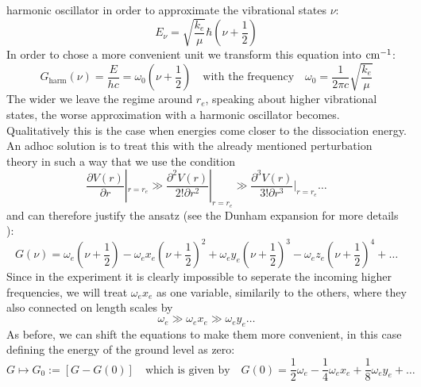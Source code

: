 harmonic oscillator in order to approximate
the vibrational states $\nu$:
\begin{equation}
    E_\nu =\sqrt{\frac{k_e}{\mu}}\hbar \left (\nu
        + \frac{1}{2}\right )
\end{equation}
In order to chose a more convenient unit we transform this
equation into $\mathrm{cm^{-1}}$:
\begin{equation}
    G_\mathrm{harm}\left(\nu\right) = \frac{E}{hc} = \omega_0 \left(\nu + \frac{1}{2}\right)
    \quad \text{with the frequency} \quad
    \omega_0 = \frac{1}{2\pi c} \sqrt{\frac{k_e}{\mu}}
    \label{eqn:freq}
\end{equation}
The wider we leave the regime around $r_e$, speaking about 
higher vibrational states, the worse approximation with a harmonic
oscillator becomes. Qualitatively this is the case when energies
come closer to the dissociation energy. An adhoc solution is 
to treat this with the already mentioned perturbation theory in such
a way that we use the condition
\begin{equation}
    \frac{\partial V(r)}{\partial r}|_{r=r_e}        \gg
    \frac{\partial^2 V(r)}{2!\partial r^2}|_{r=r_e}  \gg
    \frac{\partial^3 V(r)}{3!\partial r^3}|_{r=r_e}  
    \ldots
\end{equation}
and can therefore justify the ansatz (see the Dunham expansion
for more details \cite{lefebvre2004spectra}):
\begin{equation}
    G\left(\nu\right) = \omega_e \left(\nu + \frac{1}{2} \right) 
    - \omega_e x_e \left(\nu + \frac{1}{2} \right) ^2 
    + \omega_e y_e \left(\nu + \frac{1}{2} \right) ^3 
    - \omega_e z_e \left(\nu + \frac{1}{2} \right) ^4 
    + \ldots 
    \label{eqn:G(v)_taylor}
\end{equation}
Since in the experiment it is clearly impossible to seperate
the incoming higher frequencies, we will treat $\omega_e x_e$ as 
one variable, similarily to the others, where they also connected
on length scales by
\begin{equation}
    \omega_e \gg \omega_ex_e \gg \omega_e y_e \ldots 
    \label{eqn:gg}
\end{equation}
As before, we can shift the equations to make them more convenient,
in this case defining the energy of the ground level as zero:
\begin{equation}
    G \mapsto G_0 := \left [G-G(0) \right ] 
        \quad \text{which is given by}
    \quad G(0)=\frac{1}{2}\omega_e - \frac{1}{4}\omega_e x_e 
    + \frac{1}{8} \omega_e y_e + \ldots 
\end{equation}

